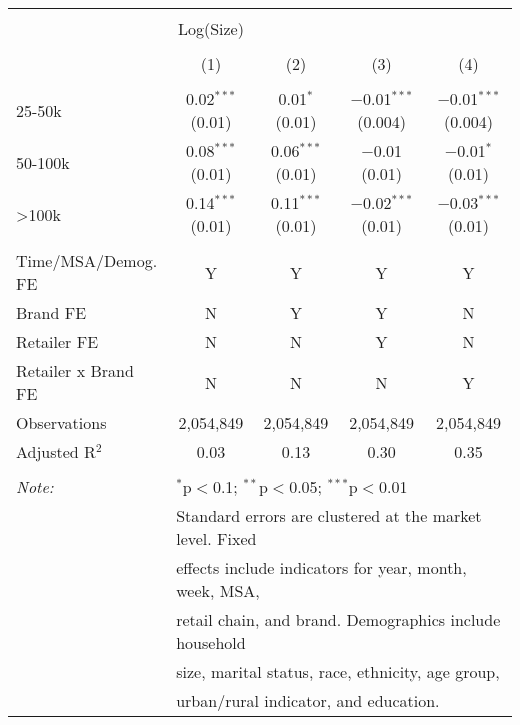 
\begin{table}[!htbp] \centering 
  \caption{} 
  \label{tab:packageSizeFull7870} 
\begin{tabular}{@{\extracolsep{5pt}}lcccc} 
\\[-1.8ex]\hline 
\hline \\[-1.8ex] 
 & Log(Size) &  &  &  \\ 
\\[-1.8ex] & (1) & (2) & (3) & (4)\\ 
\hline \\[-1.8ex] 
 25-50k & 0.02$^{***}$ (0.01) & 0.01$^{*}$ (0.01) & $-$0.01$^{***}$ (0.004) & $-$0.01$^{***}$ (0.004) \\ 
  50-100k & 0.08$^{***}$ (0.01) & 0.06$^{***}$ (0.01) & $-$0.01 (0.01) & $-$0.01$^{*}$ (0.01) \\ 
  >100k & 0.14$^{***}$ (0.01) & 0.11$^{***}$ (0.01) & $-$0.02$^{***}$ (0.01) & $-$0.03$^{***}$ (0.01) \\ 
 \hline \\[-1.8ex] 
Time/MSA/Demog. FE & Y & Y & Y & Y \\ 
Brand FE & N & Y & Y & N \\ 
Retailer FE & N & N & Y & N \\ 
Retailer x Brand FE & N & N & N & Y \\ 
Observations & 2,054,849 & 2,054,849 & 2,054,849 & 2,054,849 \\ 
Adjusted R$^{2}$ & 0.03 & 0.13 & 0.30 & 0.35 \\ 
\hline 
\hline \\[-1.8ex] 
\textit{Note:}  & \multicolumn{4}{l}{$^{*}$p$<$0.1; $^{**}$p$<$0.05; $^{***}$p$<$0.01} \\ 
 & \multicolumn{4}{l}{Standard errors are clustered at the market level. Fixed } \\ 
 & \multicolumn{4}{l}{effects include indicators for year, month, week, MSA, } \\ 
 & \multicolumn{4}{l}{retail chain, and brand. Demographics include household } \\ 
 & \multicolumn{4}{l}{size, marital status, race, ethnicity, age group, } \\ 
 & \multicolumn{4}{l}{urban/rural indicator, and education.} \\ 
\end{tabular} 
\end{table} 
